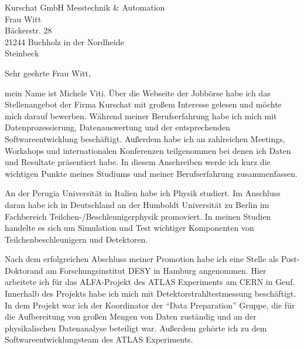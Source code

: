 \documentclass[ebner,paper=a4,fontsize=11pt,ngerman,BCOR=10mm]{scrlttr2}%
\begin{document}
\pagestyle{empty}

\begin{letter}{Kurschat GmbH Messtechnik \& Automation\\
Frau Witt\\
B{\"a}ckerstr. 28\\
21244 Buchholz in der Nordheide\\
Steinbeck}


\opening{Sehr geehrte Frau Witt,} 

mein Name ist Michele Viti. 
\"Uber %
die Webseite der Jobb{\"o}rse
habe ich das Stellenangebot der Firma Kurschat mit gro{\ss}em Interesse
gelesen und m{\"o}chte mich darauf bewerben.  W\"ahrend meiner
Berufserfahrung habe ich mich mit Datenprozessierung, Datenauswertung
und der entsprechenden Softwareentwicklung besch{\"a}ftigt.
Au{\ss}erdem habe ich an zahlreichen Meetings, Workshops und
internationalen Konferenzen teilgenommen bei denen ich Daten und
Resultate pr\"asentiert habe. In diesem Anschreiben werde ich kurz die
wichtigen Punkte meines Studiums und meiner Berufserfahrung
zusammenfassen.



An der Perugia Universit\"at in Italien habe ich Physik studiert. Im
Anschluss daran habe ich in Deutschland an der Humboldt Universit\"at
zu Berlin im Fachbereich Teilchen-/Beschleunigerphysik promoviert. In
meinen Studien handelte es sich um Simulation und Test wichtiger
Komponenten von Teilchenbeschleunigern und Detektoren.

Nach dem erfolgreichen Abschluss meiner Promotion habe ich eine Stelle
als Post-Doktorand am Forschungsinstitut DESY in Hamburg
angenommen. Hier arbeitete ich f\"ur das ALFA-Projekt des ATLAS
Experiments am CERN in Genf. Innerhalb des Projekts habe ich mich mit
Detektorstrahltestmessung besch\"aftigt. In dem Projekt war ich der
Koordinator der "`Data Preparation"' Gruppe, die f\"ur die Aufbereitung
von gro{\ss}en Mengen von Daten zust\"andig und an der physikalischen
Datenanalyse beteiligt war. Au{\ss}erdem geh{\"o}rte ich zu dem
Softwareentwicklungsteam des ATLAS Experiments.


\end{letter}
\end{document}
